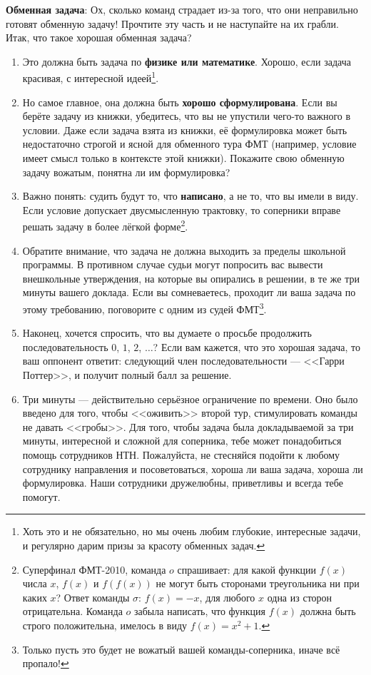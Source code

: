 \documentclass[12pt]{article}
\begin{document}
{\bf Обменная задача}: Ох, сколько команд страдает из-за того, что они неправильно готовят обменную задачу! Прочтите эту часть и не наступайте на их грабли. Итак, что такое хорошая обменная задача? 
\begin{enumerate}
\item Это должна быть задача по {\bf физике или математике}. Хорошо, если задача красивая, с интересной идеей\footnote{Хоть это и не обязательно, но мы очень любим глубокие, интересные задачи, и регулярно дарим призы за красоту обменных задач.}. 

\item Но самое главное, она должна быть {\bf хорошо сформулирована}. Если вы берёте задачу из книжки, убедитесь, что вы не упустили чего-то важного в условии. Даже если задача взята из книжки, её формулировка может быть недостаточно строгой и ясной для обменного тура ФМТ (например, условие имеет смысл только в контексте этой книжки). Покажите свою обменную задачу вожатым, понятна ли им формулировка? 

\item Важно понять: судить будут то, что {\bf написано}, а не то, что вы имели в виду. Если условие допускает двусмысленную трактовку, то соперники вправе решать задачу в более лёгкой форме\footnote{Суперфинал ФМТ-2010, команда $o$ спрашивает: для какой функции $f(x)$ числа $x$, $f(x)$ и $f(f(x))$ не могут быть сторонами треугольника ни при каких $x$? Ответ команды $\sigma$: $f(x) = -x$, для любого $x$ одна из сторон отрицательна. Команда $o$ забыла написать, что функция $f(x)$ должна быть строго положительна, имелось в виду $f(x) = x^2 + 1$.}. 

\item Обратите внимание, что задача не должна выходить за пределы школьной программы. В противном случае судьи могут попросить вас вывести внешкольные утверждения, на которые вы опирались в решении, в те же три минуты вашего доклада. Если вы сомневаетесь, проходит ли ваша задача по этому требованию, поговорите с одним из судей ФМТ\footnote{Только пусть это будет не вожатый вашей команды-соперника, иначе всё пропало!}.

\item Наконец, хочется спросить, что вы думаете о просьбе продолжить последовательность $0$, $1$, $2$, $\ldots$? Если вам кажется, что это хорошая задача, то ваш оппонент ответит: следующий член последовательности --- <<Гарри Поттер>>, и получит полный балл за решение.

\item Три минуты --- действительно серьёзное ограничение по времени. Оно было введено для того, чтобы <<оживить>> второй тур, стимулировать команды не давать <<гробы>>. Для того, чтобы задача была докладываемой за три минуты, интересной и сложной для соперника, тебе может понадобиться помощь сотрудников НТН. Пожалуйста, не стесняйся подойти к любому сотруднику направления и посоветоваться, хороша ли ваша задача, хороша ли формулировка. Наши сотрудники дружелюбны, приветливы и всегда тебе помогут.
\end{enumerate}
\end{document}
